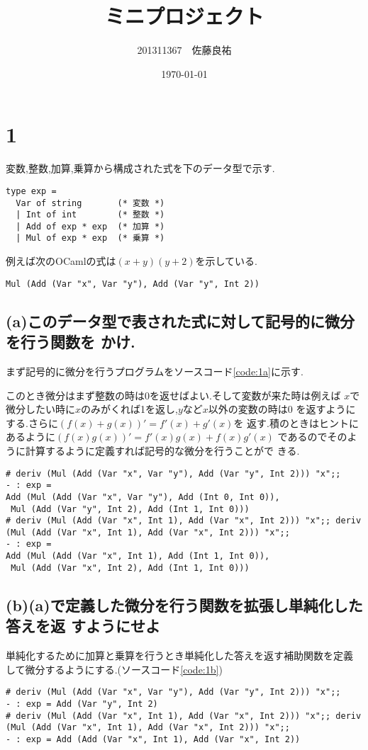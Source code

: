 \documentclass[11pt,a4j]{jarticle}
\title{ミニプロジェクト}
\author{201311367　佐藤良祐}
\date{\today}
\begin{document}
\section*{1}
変数,整数,加算,乗算から構成された式を下のデータ型で示す.
\begin{lstlisting}
type exp =
  Var of string       (* 変数 *)
  | Int of int        (* 整数 *)
  | Add of exp * exp  (* 加算 *)
  | Mul of exp * exp  (* 乗算 *)
\end{lstlisting}
例えば次のOCamlの式は$(x+y)(y+2)$を示している.
\begin{verbatim}
Mul (Add (Var "x", Var "y"), Add (Var "y", Int 2))    
\end{verbatim}

  \subsection*{(a)このデータ型で表された式に対して記号的に微分を行う関数を
  かけ.}
  まず記号的に微分を行うプログラムをソースコード\ref{code:1a}に示す.

  このとき微分はまず整数の時は0を返せばよい.そして変数が来た時は例えば
  $x$で微分したい時に$x$のみがくれば1を返し,$y$など$x$以外の変数の時は0
  を返すようにする.さらに$(f(x) + g(x))' = f'(x) + g'(x)$を
  返す.積のときはヒントにあるように$(f(x)g(x))' = f'(x)g(x) + f(x)g'(x)$
  であるのでそのように計算するように定義すれば記号的な微分を行うことがで
  きる.

  
\begin{lstlisting}[caption=記号的微分を行うプログラムを実行した結果]
# deriv (Mul (Add (Var "x", Var "y"), Add (Var "y", Int 2))) "x";;
- : exp =
Add (Mul (Add (Var "x", Var "y"), Add (Int 0, Int 0)),
 Mul (Add (Var "y", Int 2), Add (Int 1, Int 0)))
# deriv (Mul (Add (Var "x", Int 1), Add (Var "x", Int 2))) "x";; deriv (Mul (Add (Var "x", Int 1), Add (Var "x", Int 2))) "x";;
- : exp =
Add (Mul (Add (Var "x", Int 1), Add (Int 1, Int 0)),
 Mul (Add (Var "x", Int 2), Add (Int 1, Int 0)))
\end{lstlisting}
  \subsection*{(b)(a)で定義した微分を行う関数を拡張し単純化した答えを返
  すようにせよ}
  単純化するために加算と乗算を行うとき単純化した答えを返す補助関数を定義
  して微分するようにする.(ソースコード\ref{code:1b})
  
   \begin{lstlisting}[caption=実行結果]
# deriv (Mul (Add (Var "x", Var "y"), Add (Var "y", Int 2))) "x";;
- : exp = Add (Var "y", Int 2)
# deriv (Mul (Add (Var "x", Int 1), Add (Var "x", Int 2))) "x";; deriv (Mul (Add (Var "x", Int 1), Add (Var "x", Int 2))) "x";;
- : exp = Add (Add (Var "x", Int 1), Add (Var "x", Int 2))    
   \end{lstlisting}
\end{document}
